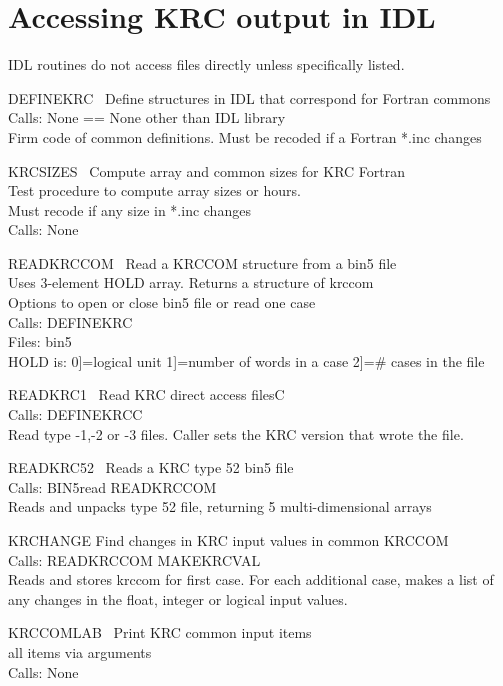 \documentclass{article}
\begin{document}
\section{Accessing KRC output in IDL} %

IDL routines do not access files directly unless specifically listed.

DEFINEKRC \ Define structures in IDL that correspond for Fortran commons \\
Calls: None == None other than IDL library \\
Firm code of common definitions. Must be recoded if a Fortran *.inc changes

KRCSIZES \ Compute array and common sizes for KRC Fortran \\
Test procedure to compute array sizes or hours. \\
Must recode if any size in *.inc changes \\
Calls: None

READKRCCOM \ Read a KRCCOM structure from a bin5 file \\
Uses 3-element HOLD array. Returns a structure of krccom \\
Options to open or close bin5 file or read one case  \\
Calls: DEFINEKRC \\
Files: bin5 \\
HOLD is: 0]=logical unit  1]=number of words in a case  2]=\# cases in the file 

READKRC1 \ Read KRC direct access filesC \\
Calls:  DEFINEKRCC \\
Read type -1,-2 or -3 files. Caller sets the KRC version that wrote the file. 

READKRC52 \ Reads a KRC type 52 bin5 file \\
Calls:  BIN5read  READKRCCOM \\
Reads and unpacks type 52 file, returning 5 multi-dimensional arrays

KRCHANGE   Find changes in KRC input values in common KRCCOM \\
Calls:  READKRCCOM  MAKEKRCVAL \\
Reads and stores krccom for first case. For each additional case, makes a 
list of any changes in the float, integer or logical input values. 

KRCCOMLAB \ Print KRC common input items \\
 all items via arguments \\
Calls: None
\end{document}

